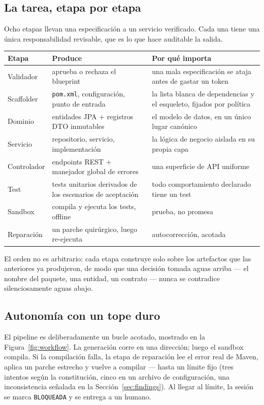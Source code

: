 \documentclass[11pt,a4paper]{article}
\begin{document}
\subsection{La tarea, etapa por etapa}

Ocho etapas llevan una especificación a un servicio verificado. Cada una tiene una
única responsabilidad revisable, que es lo que hace auditable la salida.

\begin{center}
\begin{longtable}{@{}p{}p{}p{}@{}}
\toprule
\textbf{Etapa} & \textbf{Produce} & \textbf{Por qué importa} \\
\midrule
Validador & aprueba o rechaza el blueprint & una mala especificación se ataja antes de gastar un token \\
Scaffolder & \texttt{pom.xml}, configuración, punto de entrada & la lista blanca de dependencias y el esqueleto, fijados por política \\
Dominio & entidades JPA + registros DTO inmutables & el modelo de datos, en un único lugar canónico \\
Servicio & repositorio, servicio, implementación & la lógica de negocio aislada en su propia capa \\
Controlador & endpoints REST + manejador global de errores & una superficie de API uniforme \\
Test & tests unitarios derivados de los escenarios de aceptación & todo comportamiento declarado tiene un test \\
Sandbox & compila y ejecuta los tests, offline & prueba, no promesa \\
Reparación & un parche quirúrgico, luego re-ejecuta & autocorrección, acotada \\
\bottomrule
\end{longtable}
\end{center}

El orden no es arbitrario: cada etapa construye solo sobre los artefactos que las
anteriores ya produjeron, de modo que una decisión tomada aguas arriba --- el nombre
del paquete, una entidad, un contrato --- nunca se contradice silenciosamente aguas
abajo.

\subsection{Autonomía con un tope duro}

El pipeline es deliberadamente un bucle acotado, mostrado en la
Figura~\ref{fig:workflow}. La generación corre en una dirección; luego el sandbox
compila. Si la compilación falla, la etapa de reparación lee el error real de Maven,
aplica un parche estrecho y vuelve a compilar --- hasta un límite fijo (tres intentos
según la constitución, cinco en un archivo de configuración, una inconsistencia
señalada en la Sección~\ref{sec:findings}). Al llegar al límite, la sesión se marca
\texttt{BLOQUEADA} y se entrega a un humano.
\end{document}
